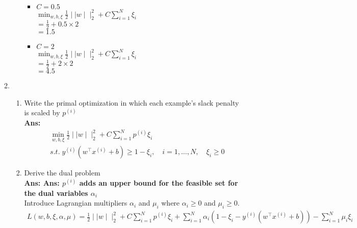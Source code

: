 \documentclass{article}
\theoremstyle{definition}
\theoremstyle{remark}
\begin{document}
\begin{enumerate}[font={\Large\bfseries},left=0pt]
\begin{tcolorbox}
\begin{enumerate}
\begin{enumerate}
\begin{multicols}{2}
					            \begin{itemize}
						            \item $C = 0.5$ \\
						                  $\min_{w, b, \xi} \frac{1}{2} \mid\mid w \mid\mid^2_2 + C \sum^N_{i = 1} \xi_i$ \\
						                  $= \frac{1}{2} + 0.5 \times 2$ \\
						                  $= 1.5$
						            \item $C = 2$ \\
						                  $\min_{w, b, \xi} \frac{1}{2} \mid\mid w \mid\mid^2_2 + C \sum^N_{i = 1} \xi_i$ \\
						                  $= \frac{1}{2} + 2 \times 2$ \\
						                  $= 4.5$
					            \end{itemize}
				            \end{multicols}

			      \end{enumerate}
			\item \begin{enumerate}
				      \item Write the primal optimization in which each example's slack penalty is scaled by $p^{(i)}$ \\
				            \textbf{Ans:} \\
				            \begin{align}
					             & \min_{w, b, \xi} \frac{1}{2} \mid\mid w\mid\mid^2_2 + C\sum^N_{i = 1} p^{(i)}\xi_i              \\
					             & s.t. \; y^{(i)}(w^\intercal x^{(i)} + b) \ge 1 - \xi_i, \quad i = 1, \dots, N,\quad \xi_i \ge 0
				            \end{align}
				      \item Derive the dual problem\\
				            \textbf{Ans: Ans: $p^{(i)}$ adds an upper bound for the feasible set for the dual variables $\alpha_i$} \\
				            Introduce Lagrangian multipliers $\alpha_i$ and $\mu_i$ where $\alpha_i \ge 0$ and $\mu_i \ge 0$. \\
				            \begin{align}
					            L(w, b, \xi, \alpha, \mu) = \frac{1}{2} \mid\mid w \mid\mid^2_2 + C\sum^{N}_{i = 1}p^{(i)} \xi_i + \sum^{N}_{i = 1}\alpha_i (1 - \xi_i - y^{(i)}(w^\intercal x^{(i)} + b)) - \sum^{N}_{i=1} \mu_i \xi_i
				            \end{align}


\end{enumerate}
\end{enumerate}
\end{tcolorbox}
\end{enumerate}
\end{document}
